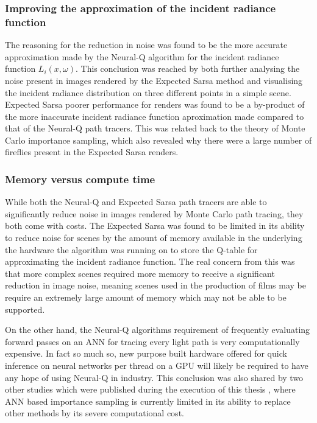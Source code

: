 \documentclass[../dissertation.tex]{subfiles}
\begin{document}
\subsubsection*{Improving the approximation of the incident radiance function}
The reasoning for the reduction in noise was found to be the more accurate approximation made by the Neural-Q algorithm for the incident radiance function $L_i(x, \omega)$. This conclusion was reached by both further analysing the noise present in images rendered by the Expected Sarsa method and visualising the incident radiance distribution on three different points in a simple scene. Expected Sarsa poorer performance for renders was found to be a by-product of the more inaccurate incident radiance function aproximation made compared to that of the Neural-Q path tracers. This was related back to the theory of Monte Carlo importance sampling, which also revealed why there were a large number of fireflies present in the Expected Sarsa renders. 

\subsubsection*{Memory versus compute time}
While both the Neural-Q and Expected Sarsa path tracers are able to significantly reduce noise in images rendered by Monte Carlo path tracing, they both come with costs. The Expected Sarsa was found to be limited in its ability to reduce noise for scenes by the amount of memory available in the underlying the hardware the algorithm was running on to store the Q-table for approximating the incident radiance function. The real concern from this was that more complex scenes required more memory to receive a significant reduction in image noise, meaning scenes used in the production of films may be require an extremely large amount of memory which may not be able to be supported.

On the other hand, the Neural-Q algorithms requirement of frequently evaluating forward passes on an ANN for tracing every light path is very computationally expensive. In fact so much so, new purpose built hardware offered for quick inference on neural networks per thread on a GPU will likely be required to have any hope of using Neural-Q in industry. This conclusion was also shared by two other studies which were published during the execution of this thesis \cite{}, where ANN based importance sampling is currently limited in its ability to replace other methods by its severe computational cost. 
\end{document}

